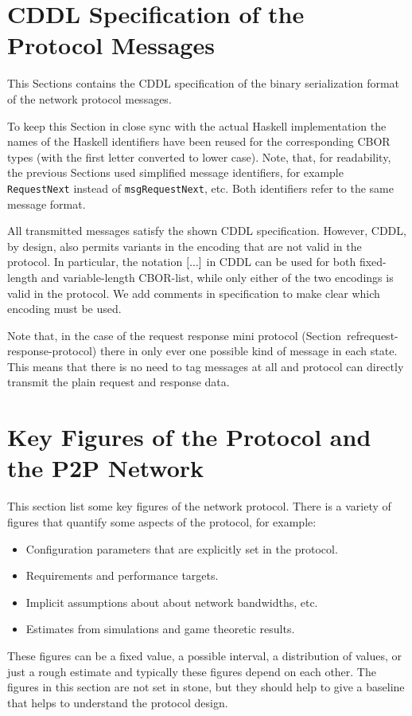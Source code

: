 \documentclass{report}
\newcommand{\hsref}[1]{} %
\newcommand{\wip}[1]{\color{magenta}{#1}\color{black}}
\theoremstyle{definition}{
  \newtheorem{lemma}{Lemma}[section] %
  \newtheorem{definition}[lemma]{Definition}
}
\theoremstyle{theorem}{
  \newtheorem{invariant}[lemma]{Invariant}
  \newtheorem{proofobligation}[lemma]{Proof Obligation}
}
\numberwithin{equation}{lemma}
\begin{document}
\appendix
\section{CDDL Specification of the Protocol Messages}
\hsref{ouroboros-network/src/Ouroboros/Network/Protocol/PingPong/Codec.hs}
\label{included-cddl}
\label{CBOR-section}
This Sections contains the CDDL\cite{cddl} specification
of the binary serialization format of the network protocol messages.

To keep this Section in close sync with the actual Haskell implementation
the names of the Haskell identifiers have been reused for the corresponding
CBOR types (with the first letter converted to lower case).
Note, that, for readability, the previous Sections used simplified message identifiers,
for example {\tt RequestNext} instead of {\tt msgRequestNext}, etc.
Both identifiers refer to the same message format.

All transmitted messages satisfy the shown CDDL specification.
However, CDDL, by design, also permits variants in the encoding that are not valid in the protocol.
In particular, the notation ${\tt [} ... {\tt ]}$ in CDDL can be used for both fixed-length  
and variable-length CBOR-list, while only either of the two encodings is valid in the protocol.
We add comments in specification to make clear which encoding must be used.

Note that, in the case of the request response mini protocol (Section~ref{request-response-protocol})
there in only ever one possible kind of message in each state.
This means that there is no need to tag messages at all and protocol can directly transmit the plain
request and response data.

\wip{TODO: test that messages.cddl actually works !}




\section{Key Figures of the Protocol and the P2P Network}
This section list some key figures of the network protocol.
There is a variety of figures that quantify some aspects of the protocol, for example:
\begin{itemize}
\item Configuration parameters that are explicitly set in the protocol.
\item Requirements and performance targets.
\item Implicit assumptions about about network bandwidths, etc.
\item Estimates from simulations and game theoretic results.
\end{itemize}
These figures can be a fixed value, a possible interval, a distribution of values,
or just a rough estimate and typically these figures depend on each other.
The figures in this section are not set in stone, but they should help to give a baseline that helps
to understand the protocol design.
\end{document}
